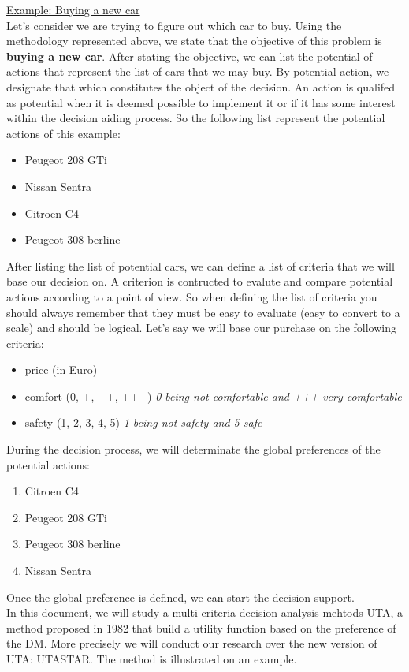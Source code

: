 \documentclass{report}
\begin{document}
\underline{Example: Buying a new car} \\
Let's consider we are trying to figure out which car to buy. Using the methodology represented above, we state that the objective of this problem is \textbf{buying a new car}. After stating the objective, we can list the potential of actions that represent the list of cars that we may buy. By potential action, we designate that which constitutes the object of the decision. An action is qualifed as potential when it is deemed possible to implement it or if it has some interest within the decision aiding process. So the following list represent the potential actions of this example: 
\begin{itemize}
\item Peugeot 208 GTi
\item Nissan Sentra
\item Citroen C4
\item Peugeot 308 berline
\end{itemize}
After listing the list of potential cars, we can define a list of criteria that we will base our decision on. A criterion is contructed to evalute and compare potential actions according to a point of view. So when defining the list of criteria you should always remember that they must be easy to evaluate (easy to convert to a scale) and should be logical.
Let's say we will base our purchase on the following criteria:
\begin{itemize}
\item price (in Euro)
\item comfort (0, +, ++, +++) \textit{0 being not comfortable and +++ very comfortable}
\item safety (1, 2, 3, 4, 5) \textit{1 being not safety and 5 safe}
\end{itemize}
During the decision process, we will determinate the global preferences of the potential actions:
\begin{enumerate}
\item Citroen C4
\item Peugeot 208 GTi
\item Peugeot 308 berline
\item Nissan Sentra
\end{enumerate}
Once the global preference is defined, we can start the decision support.\\

In this document, we will study a multi-criteria decision analysis mehtods UTA, a method proposed in 1982 that build a utility function based on the preference of the DM. More precisely we will conduct our research over the new version of UTA: UTASTAR. The method is illustrated on an example.
\end{document}
